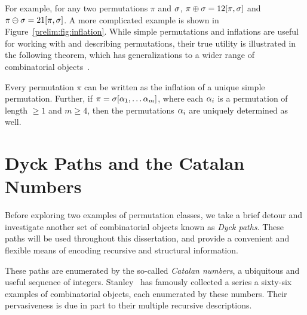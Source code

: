     For example, for any two permutations $\pi$ and $\sigma$, $\pi \oplus \sigma =
    12[\pi, \sigma]$ and $\pi \ominus \sigma = 21[\pi, \sigma]$. A more complicated
    example is shown in Figure~\ref{prelim:fig:inflation}. While simple
    permutations and inflations are useful for working with and describing
    permutations, their true utility is illustrated in the following theorem,
    which has generalizations to a wider range of combinatorial
    objects~\cite{SubsDecomp}. 



    \begin{theorem}
      \label{thm:subsdecomp}
      Every permutation $\pi$ can be written as the inflation of a
      unique simple permutation. Further, if $\pi = \sigma[\alpha_1, \dots \alpha_m]$,
      where each $\alpha_i$ is a permutation of length $\geq 1$ and
      $m \geq 4$, then the permutations $\alpha_i$ are uniquely determined as
      well. 
    \end{theorem}



\section{Dyck Paths and the Catalan Numbers}

    Before exploring two examples of permutation classes, we take a brief
    detour and investigate another set of combinatorial objects known as 
    \emph{Dyck paths}. These paths will be used throughout this dissertation,
    and provide a convenient and flexible means of encoding recursive and
    structural information. 
    
    These paths are enumerated by the so-called
    \emph{Catalan numbers}, a ubiquitous and useful sequence of integers.
    Stanley~\cite{Stanley2} has famously collected a series a sixty-six
    examples of combinatorial objects, each enumerated by these numbers. Their
    pervasiveness is due in part to their multiple recursive descriptions. 
    

